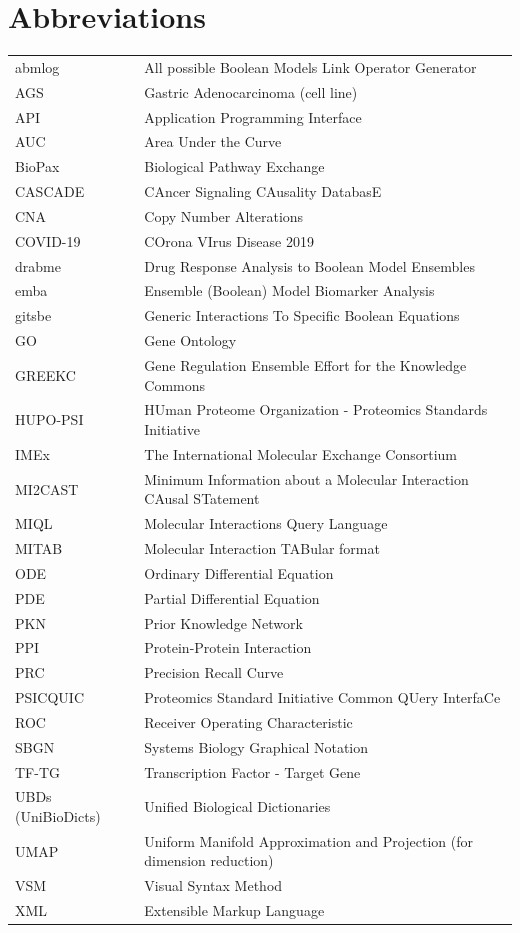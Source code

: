 \documentclass[
  12pt,
]{book}
\begin{document}
\hypertarget{abbreviations}{%
\chapter*{Abbreviations}\label{abbreviations}}

\begin{longtable}{ll}
\toprule
abmlog & All possible Boolean Models Link Operator Generator\\
AGS & Gastric Adenocarcinoma (cell line)\\
API & Application Programming Interface\\
AUC & Area Under the Curve\\
BioPax & Biological Pathway Exchange\\
\addlinespace
CASCADE & CAncer Signaling CAusality DatabasE\\
CNA & Copy Number Alterations\\
COVID-19 & COrona VIrus Disease 2019\\
drabme & Drug Response Analysis to Boolean Model Ensembles\\
emba & Ensemble (Boolean) Model Biomarker Analysis\\
\addlinespace
gitsbe & Generic Interactions To Specific Boolean Equations\\
GO & Gene Ontology\\
GREEKC & Gene Regulation Ensemble Effort for the Knowledge Commons\\
HUPO-PSI & HUman Proteome Organization - Proteomics Standards Initiative\\
IMEx & The International Molecular Exchange Consortium\\
\addlinespace
MI2CAST & Minimum Information about a Molecular Interaction CAusal STatement\\
MIQL & Molecular Interactions Query Language\\
MITAB & Molecular Interaction TABular format\\
ODE & Ordinary Differential Equation\\
PDE & Partial Differential Equation\\
\addlinespace
PKN & Prior Knowledge Network\\
PPI & Protein-Protein Interaction\\
PRC & Precision Recall Curve\\
PSICQUIC & Proteomics Standard Initiative Common QUery InterfaCe\\
ROC & Receiver Operating Characteristic\\
\addlinespace
SBGN & Systems Biology Graphical Notation\\
TF-TG & Transcription Factor - Target Gene\\
UBDs (UniBioDicts) & Unified Biological Dictionaries\\
UMAP & Uniform Manifold Approximation and Projection (for dimension reduction)\\
VSM & Visual Syntax Method\\
\addlinespace
XML & Extensible Markup Language\\
\bottomrule
\end{longtable}
\end{document}
